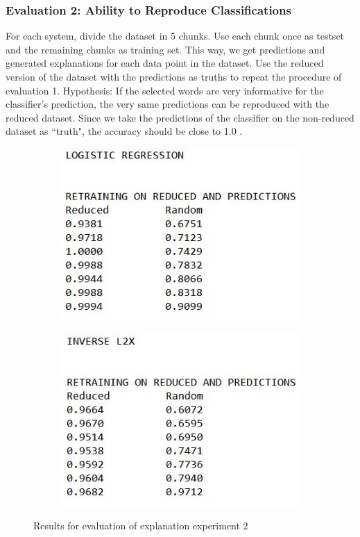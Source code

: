 {\subsubsection{Evaluation 2: Ability to Reproduce Classifications}
For each system, divide the dataset in 5 chunks. Use each chunk once as testset and the remaining chunks as training set. This way, we get predictions and generated explanations for each data point in the dataset. Use the reduced version of the dataset with the predictions as truths to repeat the procedure of evaluation 1. Hypothesis: If the selected words are very informative for the classifier's prediction, the very same predictions can be reproduced with the reduced dataset. Since we take the predictions of the classifier on the non-reduced dataset as ``truth", the accuracy should be close to 1.0 .
\begin{figure}[H]
	\centering
	\begin{subfigure}[b]{0.4\textwidth}
		\includegraphics[width=\textwidth]{img/expleval2_logreg.JPG}
	\end{subfigure}
	\begin{subfigure}[b]{0.4\textwidth}
		\includegraphics[width=\textwidth]{img/expleval2_invL2X.JPG}
	\end{subfigure}
	\caption{Results for evaluation of explanation experiment 2}
	\label{fig:results_expleval2}
\end{figure}



}
